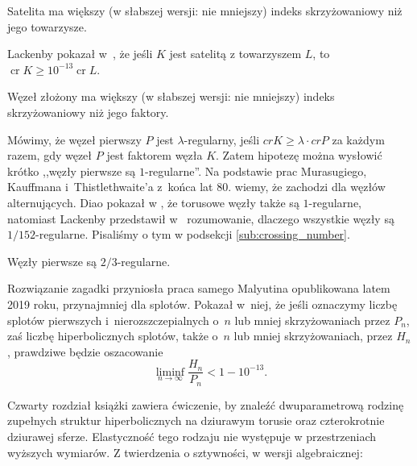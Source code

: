\begin{conjecture}
    Satelita ma większy (w słabszej wersji: nie mniejszy) indeks skrzyżowaniowy niż jego towarzysze.
\end{conjecture}

Lackenby pokazał w~\cite{lackenby14}, że jeśli $K$ jest satelitą z towarzyszem $L$, to $\operatorname{cr} K \ge 10^{-13} \operatorname{cr} L$.

\begin{conjecture}
    Węzeł złożony ma większy (w słabszej wersji: nie mniejszy) indeks skrzyżowaniowy niż jego faktory.
\end{conjecture}

Mówimy, że węzeł pierwszy $P$ jest $\lambda$-regularny, jeśli $cr K \ge \lambda \cdot cr P$ za każdym razem, gdy węzeł $P$ jest faktorem węzła $K$.
Zatem hipotezę można wysłowić krótko ,,węzły pierwsze są $1$-regularne''.
Na podstawie prac Murasugiego, Kauffmana i~Thistlethwaite'a z~końca lat 80. wiemy, że zachodzi dla węzłów alternujących.
Diao pokazał w \cite[tw. 3.8]{diao04}, że torusowe węzły także są $1$-regularne, natomiast Lackenby przedstawił w~\cite{lackenby09} rozumowanie, dlaczego wszystkie węzły są $1/152$-regularne.
Pisaliśmy o tym w podsekcji \ref{sub:crossing_number}.

\begin{conjecture}
    \label{con:malyutin4}
    Węzły pierwsze są $2/3$-regularne.
\end{conjecture}

Rozwiązanie zagadki przyniosła praca samego Malyutina \cite{malyutin19} opublikowana latem 2019 roku, przynajmniej dla splotów.
Pokazał w~niej, że jeśli oznaczymy liczbę splotów pierwszych i~nierozszczepialnych o~$n$ lub mniej skrzyżowaniach przez $P_n$, zaś liczbę hiperbolicznych splotów, także o~$n$ lub mniej skrzyżowaniach, przez $H_n$, prawdziwe będzie oszacowanie
\begin{equation}
    \liminf_{n \to \infty} \frac{H_n}{P_n} < 1 - 10^{-13}.
\end{equation}



Czwarty rozdział książki \cite{purcell2020} zawiera ćwiczenie, by znaleźć dwuparametrową rodzinę zupełnych struktur hiperbolicznych na dziurawym torusie oraz czterokrotnie dziurawej sferze.
Elastyczność tego rodzaju nie występuje w przestrzeniach wyższych wymiarów.
Z twierdzenia o sztywności, w wersji algebraicznej:

